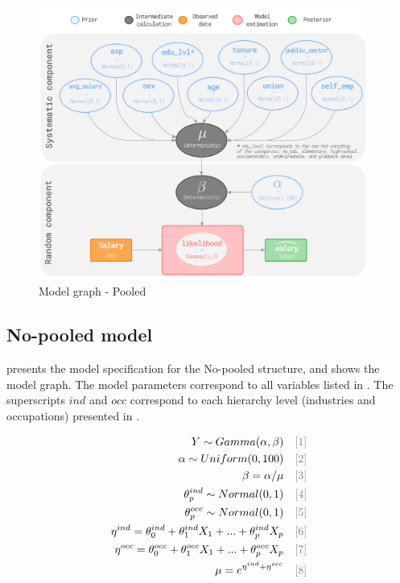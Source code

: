 \begin{figure}[H]
    \centering
    \includegraphics[width=0.96\textwidth]{images/ch5_pooled_graph/pooled_graph.png}
    \setlength{\abovecaptionskip}{-12pt}
    \caption{Model graph - Pooled}
    \label{fig:model_graph_pooled}
\end{figure}

\subsection{No-pooled model} 

 presents the model specification for the No-pooled structure, and  shows the model graph. The model parameters correspond to all variables listed in . The superscripts $ind$  and $occ$ correspond to each hierarchy level (industries and occupations) presented in . 

\begin{gather}
    \begin{split}
        Y \sim Gamma(\alpha,\beta) \quad \textcolor{gray}{[\text{1}]} \\
        \alpha \sim Uniform(0, 100) \quad \textcolor{gray}{[\text{2}]} \\
        \beta=\alpha/\mu \quad \textcolor{gray}{[\text{3}]} \\
        \theta_{p}^{ind} \sim Normal(0, 1) \quad \textcolor{gray}{[\text{4}]} \\
        \theta_{p}^{occ} \sim Normal(0, 1) \quad \textcolor{gray}{[\text{5}]} \\
        \eta^{ind} = \theta_0^{ind}+\theta_1^{ind}X_1+...+\theta_p^{ind}X_p \quad \textcolor{gray}{[\text{6}]} \\
        \eta^{occ} = \theta_0^{occ}+\theta_1^{occ}X_1+...+\theta_p^{occ}X_p \quad \textcolor{gray}{[\text{7}]} \\
        \mu=e^{\eta^{ind}+\eta^{occ}} \quad \textcolor{gray}{[\text{8}]} \\
    \end{split}\label{eq:no_pooled_model}
\end{gather}

